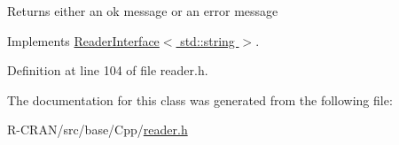 \begin{DoxyReturn}{Returns}
either an ok message or an error message 
\end{DoxyReturn}


Implements \hyperlink{classReaderInterface_a5f86ed49eac808ed0a912f7d670c4042}{Reader\+Interface$<$ std\+::string $>$}.



Definition at line 104 of file reader.\+h.



The documentation for this class was generated from the following file\+:\begin{DoxyCompactItemize}
\item 
R-\/\+C\+R\+A\+N/src/base/\+Cpp/\hyperlink{reader_8h}{reader.\+h}\end{DoxyCompactItemize}
